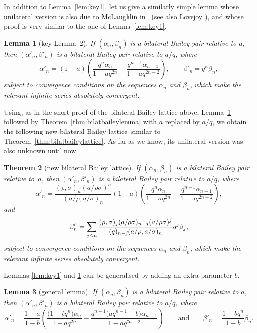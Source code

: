 \documentclass[pdftex]{sigma}
\numberwithin{equation}{section}
\newtheorem{Theorem}{Theorem}[section]
\newtheorem{Lemma}[Theorem]{Lemma}
\begin{document}
In addition to Lemma~\ref{lem:key1}, let us give a similarly simple lemma whose unilateral version is also due to McLaughlin in~\cite[Lemma~13.1\,(2)]{M} (see also Lovejoy \cite[Lemma 3.1]{Lo22}), and whose proof is very similar to the one of Lemma~\ref{lem:key1}.

\begin{Lemma}[key Lemma~2]\label{lem:key2}
If $(\alpha_n, \beta_n)$ is a bilateral Bailey pair relative to $a$, then $(\alpha'_n, \beta'_n)$ is a bilateral Bailey pair relative to $a/q$, where
\[%
\alpha'_n=(1-a)\left(\frac{q^n\alpha_n}{1-aq^{2n}}-\frac{q^{n-1}\alpha_{n-1}}{1-aq^{2n-2}}\right), \qquad \beta'_n=q^n\beta_n,
\]
subject to convergence conditions on the sequences $\alpha_n$ and $\beta_n$, which make the relevant infinite series absolutely convergent.
\end{Lemma}

Using, as in the short proof of the bilateral Bailey lattice above, Lemma~\ref{lem:key2} followed by Theorem~\ref{thm:bilatbaileylemma} with $a$ replaced by $a/q$, we obtain the following new bilateral Bailey lattice, similar to Theorem~\ref{thm:bilatbaileylattice}. As far as we know, its unilateral version was also unknown until now.

\begin{Theorem}[new bilateral Bailey lattice]\label{thm:newbilatbaileylattice}
If $(\alpha_n, \beta_n)$ is a bilateral Bailey pair relative to~$a$, then $(\alpha'_n, \beta'_n)$ is a bilateral Bailey pair relative to $a/q$, where
\begin{equation*}\alpha'_n=\frac{(\rho,\sigma)_n(a/\rho\sigma)^n}{(a/\rho,a/\sigma)_n}(1-a)\left(\frac{q^n\alpha_n}{1-aq^{2n}}-\frac{q^{n-1}\alpha_{n-1}}{1-aq^{2n-2}}\right),
\end{equation*}
and
\begin{equation*}\beta'_n=\sum_{j\leq n}{(\rho,\sigma)_j(a/\rho\sigma)_{n-j}(a/\rho\sigma)^j\over (q)_{n-j}(a/\rho,a/\sigma)_n} q^j\beta_j,
\end{equation*}
subject to convergence conditions on the sequences $\alpha_n$ and $\beta_n$, which make the relevant infinite series absolutely convergent.
\end{Theorem}

Lemmas \ref{lem:key1} and \ref{lem:key2} can be generalised by adding an extra parameter $b$.
\begin{Lemma}[general lemma]\label{lem:baileylattices}
If $(\alpha_n, \beta_n)$ is a bilateral Bailey pair relative to $a$, then $(\alpha'_n, \beta'_n)$ is a bilateral Bailey pair relative to $a/q$, where
\[%
\alpha'_n=\frac{1-a}{1-b}\left(\frac{\bigl(1-bq^n\bigr) \alpha_n}{1-aq^{2n}}-\frac{q^{n-1}\bigl(aq^{n-1}-b\bigr) \alpha_{n-1}}{1-aq^{2n-2}}\right)
\qquad \text{and} \qquad \beta'_n=\frac{1-bq^n}{1-b}\beta_n.
\]
\end{Lemma}
\end{document}
